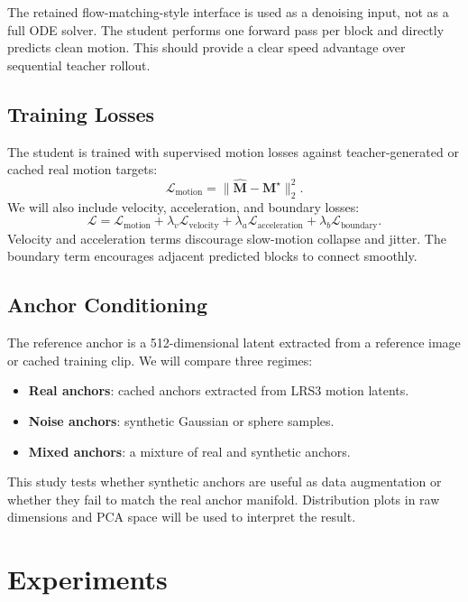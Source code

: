 \documentclass{article}
\begin{document}
The retained flow-matching-style interface is used as a denoising input, not as a full ODE solver. The student performs one forward pass per block and directly predicts clean motion. This should provide a clear speed advantage over sequential teacher rollout.

\subsection{Training Losses}

The student is trained with supervised motion losses against teacher-generated or cached real motion targets:
\begin{equation}
    \mathcal{L}_{\text{motion}} =
    \| \hat{\mathbf{M}} - \mathbf{M}^{\star} \|_2^2.
\end{equation}
We will also include velocity, acceleration, and boundary losses:
\begin{equation}
    \mathcal{L}
    =
    \mathcal{L}_{\text{motion}}
    + \lambda_v \mathcal{L}_{\text{velocity}}
    + \lambda_a \mathcal{L}_{\text{acceleration}}
    + \lambda_b \mathcal{L}_{\text{boundary}}.
\end{equation}
Velocity and acceleration terms discourage slow-motion collapse and jitter. The boundary term encourages adjacent predicted blocks to connect smoothly.

\subsection{Anchor Conditioning}

The reference anchor is a 512-dimensional latent extracted from a reference image or cached training clip. We will compare three regimes:
\begin{itemize}
    \item \textbf{Real anchors}: cached anchors extracted from LRS3 motion latents.
    \item \textbf{Noise anchors}: synthetic Gaussian or sphere samples.
    \item \textbf{Mixed anchors}: a mixture of real and synthetic anchors.
\end{itemize}

This study tests whether synthetic anchors are useful as data augmentation or whether they fail to match the real anchor manifold. Distribution plots in raw dimensions and PCA space will be used to interpret the result.

\section{Experiments}
\end{document}
